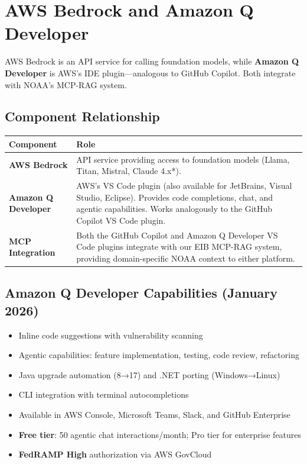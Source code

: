 \documentclass[11pt]{article}
\begin{document}
\section*{AWS Bedrock and Amazon Q Developer}

AWS Bedrock is an API service for calling foundation models, while \textbf{Amazon Q Developer} is AWS's IDE plugin---analogous to GitHub Copilot. Both integrate with NOAA's MCP-RAG system.

\subsection*{Component Relationship}
\begin{table}[h!]
\centering
\begin{tabular}{@{}p{3.5cm}p{10cm}@{}}
\toprule
\textbf{Component} & \textbf{Role} \\
\midrule
\textbf{AWS Bedrock} & API service providing access to foundation models (Llama, Titan, Mistral, Claude 4.x*). \\
\textbf{Amazon Q Developer} & AWS's VS Code plugin (also available for JetBrains, Visual Studio, Eclipse). Provides code completions, chat, and agentic capabilities. Works analogously to the GitHub Copilot VS Code plugin. \\
\textbf{MCP Integration} & Both the GitHub Copilot and Amazon Q Developer VS Code plugins integrate with our EIB MCP-RAG system, providing domain-specific NOAA context to either platform. \\
\bottomrule
\end{tabular}
\end{table}

\subsection*{Amazon Q Developer Capabilities (January 2026)}
\begin{itemize}[itemsep=2pt]
    \item Inline code suggestions with vulnerability scanning
    \item Agentic capabilities: feature implementation, testing, code review, refactoring
    \item Java upgrade automation (8→17) and .NET porting (Windows→Linux)
    \item CLI integration with terminal autocompletions
    \item Available in AWS Console, Microsoft Teams, Slack, and GitHub Enterprise
    \item \textbf{Free tier}: 50 agentic chat interactions/month; Pro tier for enterprise features
    \item \textbf{FedRAMP High} authorization via AWS GovCloud
\end{itemize}
\end{document}
